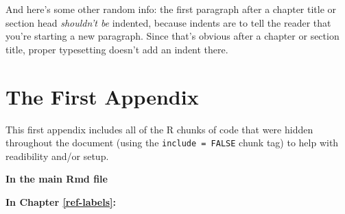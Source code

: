 \documentclass[12pt,twoside]{reedthesis}
\begin{document}
  And here's some other random info: the first paragraph after a chapter
  title or section head \emph{shouldn't be} indented, because indents are
  to tell the reader that you're starting a new paragraph. Since that's
  obvious after a chapter or section title, proper typesetting doesn't add
  an indent there.
  
  \appendix
  
  \chapter{The First Appendix}\label{the-first-appendix}
  
  This first appendix includes all of the R chunks of code that were
  hidden throughout the document (using the \texttt{include\ =\ FALSE}
  chunk tag) to help with readibility and/or setup.
  
  \textbf{In the main Rmd file}
  
  \begin{Shaded}
  \begin{Highlighting}[]
  \NormalTok{(}\OperatorTok{!}
    \NormalTok{(}\NormalTok{, } \NormalTok{)}
  \NormalTok{(}\OperatorTok{!}
  \OperatorTok{::}\NormalTok{(}\NormalTok{)}
  \end{Highlighting}
  \end{Shaded}
  
  \textbf{In Chapter \ref{ref-labels}:}
  
\end{document}
